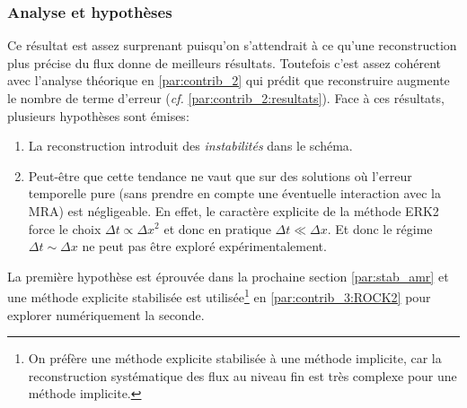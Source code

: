 \subsubsection{Analyse et hypothèses}
Ce résultat est assez surprenant puisqu'on s'attendrait à ce qu'une reconstruction plus précise du flux donne de meilleurs résultats.
Toutefois c'est assez cohérent avec l'analyse théorique en \ref{par:contrib_2} qui prédit que reconstruire augmente le nombre de terme d'erreur (\emph{cf.} \ref{par:contrib_2:resultats}).
Face à ces résultats, plusieurs hypothèses sont émises:
\begin{enumerate}
    \item La reconstruction introduit des \textit{instabilités} dans le schéma.
    \item Peut-être que cette tendance ne vaut que sur des solutions où l'erreur temporelle pure (sans prendre en compte une éventuelle interaction avec la MRA) est négligeable.
    En effet, le caractère explicite de la méthode ERK2 force le choix $\Delta t \propto \Delta x^2$ et donc en pratique $\Delta t \ll \Delta x$.
    Et donc le régime $\Delta t \sim \Delta x$ ne peut pas être exploré expérimentalement.
\end{enumerate}
La première hypothèse est éprouvée dans la prochaine section \ref{par:stab_amr} et une méthode explicite stabilisée est utilisée\footnote{
On préfère une méthode explicite stabilisée à une méthode implicite, car la reconstruction systématique des flux au niveau fin est très complexe pour une méthode implicite.} en \ref{par:contrib_3:ROCK2} pour explorer numériquement la seconde.